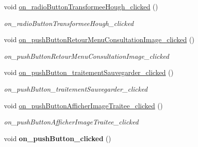 \begin{DoxyCompactItemize}
\mbox{\label{classMainWindow_a04343ce587aba1572cac5247e6a27816}} 
void \hyperlink{classMainWindow_a04343ce587aba1572cac5247e6a27816}{on\+\_\+radio\+Button\+Transformee\+Hough\+\_\+clicked} ()
\begin{DoxyCompactList}\small\item\em on\+\_\+radio\+Button\+Transformee\+Hough\+\_\+clicked \end{DoxyCompactList}\item 
\mbox{\label{classMainWindow_ad2834e748144af0bfad4218e0b324eeb}} 
void \hyperlink{classMainWindow_ad2834e748144af0bfad4218e0b324eeb}{on\+\_\+push\+Button\+Retour\+Menu\+Consultation\+Image\+\_\+clicked} ()
\begin{DoxyCompactList}\small\item\em on\+\_\+push\+Button\+Retour\+Menu\+Consultation\+Image\+\_\+clicked \end{DoxyCompactList}\item 
\mbox{\label{classMainWindow_a6469f0c600cec5c950ce8e6ea6ea8b30}} 
void \hyperlink{classMainWindow_a6469f0c600cec5c950ce8e6ea6ea8b30}{on\+\_\+push\+Button\+\_\+traitement\+Sauvegarder\+\_\+clicked} ()
\begin{DoxyCompactList}\small\item\em on\+\_\+push\+Button\+\_\+traitement\+Sauvegarder\+\_\+clicked \end{DoxyCompactList}\item 
\mbox{\label{classMainWindow_ae4205e696ff8a01767c88add581c4067}} 
void \hyperlink{classMainWindow_ae4205e696ff8a01767c88add581c4067}{on\+\_\+push\+Button\+Afficher\+Image\+Traitee\+\_\+clicked} ()
\begin{DoxyCompactList}\small\item\em on\+\_\+push\+Button\+Afficher\+Image\+Traitee\+\_\+clicked \end{DoxyCompactList}\item 
\mbox{\label{classMainWindow_a4de79c63c7fa0b8d7c468ac71f20be81}} 
void {\bfseries on\+\_\+push\+Button\+\_\+clicked} ()
\end{DoxyCompactItemize}
